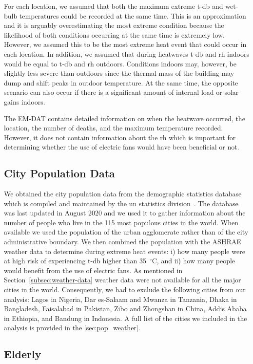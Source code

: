 For each location, we assumed that both the maximum extreme \ac{t-db} and wet-bulb temperatures could be recorded at the same time.
This is an approximation and it is arguably overestimating the most extreme condition because the likelihood of both conditions occurring at the same time is extremely low.
However, we assumed this to be the most extreme heat event that could occur in each location.
In addition, we assumed that during heatwaves \ac{t-db} and \ac{rh} indoors would be equal to \ac{t-db} and \ac{rh} outdoors.
Conditions indoors may, however, be slightly less severe than outdoors since the thermal mass of the building may dump and shift peaks in outdoor temperature.
At the same time, the opposite scenario can also occur if there is a significant amount of internal load or solar gains indoors.

The EM-DAT contains detailed information on when the heatwave occurred, the location, the number of deaths, and the maximum temperature recorded.
However, it does not contain information about the \ac{rh} which is important for determining whether the use of electric fans would have been beneficial or not.

\subsection{City Population Data}\label{subsec:population-data}

We obtained the city population data from the demographic statistics database which is compiled and maintained by the \ac{un} statistics division~\cite{UNdatare88:online}.
The database was last updated in August 2020 and we used it to gather information about the number of people who live in the 115 most populous cities in the world.
When available we used the population of the urban agglomerate rather than of the city administrative boundary.
We then combined the population with the ASHRAE weather data to determine during extreme heat events: i) how many people were at high risk of experiencing \ac{t-db} higher than 35~$^{\circ}$C\@, and ii) how many people would benefit from the use of electric fans.
As mentioned in Section~\ref{subsec:weather-data} weather data were not available for all the major cities in the world.
Consequently, we had to exclude the following cities from our analysis: Lagos in Nigeria, Dar es-Salaam and Mwanza in Tanzania, Dhaka in Bangladesh, Faisalabad in Pakistan, Zibo and Zhongshan in China, Addis Ababa in Ethiopia, and Bandung in Indonesia.
A full list of the cities we included in the analysis is provided in the \ref{sec:pop_weather}.

\subsection{Elderly}\label{subsec:elderly}

